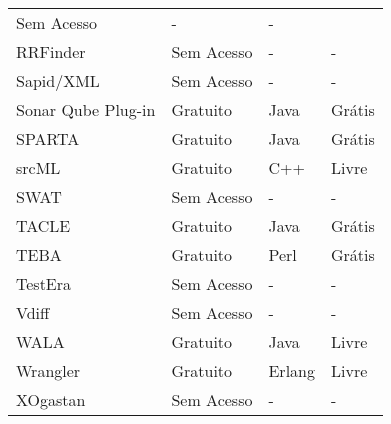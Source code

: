 \begin{longtable}{l l l l}
      Sem Acesso &
      - &
      - \\
    RRFinder &
      Sem Acesso &
      - &
      - \\
    Sapid/XML &
      Sem Acesso &
      - &
      - \\
    Sonar Qube Plug-in &
      Gratuito &
      Java &
      Grátis \\
    SPARTA &
      Gratuito &
      Java &
      Grátis \\
    srcML &
      Gratuito &
      C++ &
      Livre \\
    SWAT &
      Sem Acesso &
      - &
      - \\
    TACLE &
      Gratuito &
      Java &
      Grátis \\
    TEBA &
      Gratuito &
      Perl &
      Grátis \\
    TestEra &
      Sem Acesso &
      - &
      - \\
    Vdiff &
      Sem Acesso &
      - &
      - \\
    WALA &
      Gratuito &
      Java &
      Livre \\
    Wrangler &
      Gratuito &
      Erlang &
      Livre \\
    XOgastan &
      Sem Acesso &
      - &
      - \\
  \hline
\end{longtable}

